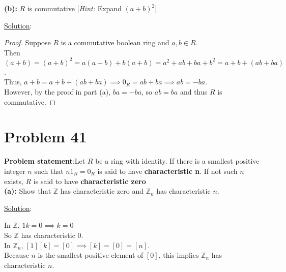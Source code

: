 \documentclass{article} %
\begin{document}
\textbf{(b):} $R$ is commutative [\textit{Hint:} Expand $(a + b)^2$]
\\
\begin{addmargin}[1em]{0em}
\underline{Solution}:
\begin{proof}
Suppose $R$ is a commutative boolean ring and $a, b \in R$.
\\Then $(a + b) = (a + b)^2 = a(a + b) + b(a + b) = a^2 + ab + ba + b^2 = a + b + (ab + ba)$.
\\Thus, $a + b = a + b + (ab + ba) \implies 0_R = ab + ba \implies ab = -ba$.
\\However, by the proof in part (a), $ba = -ba$, so $ab = ba$ and thus $R$ is commutative.
\end{proof}
\end{addmargin}

\newpage

\section*{Problem 41}

\textbf{Problem statement}:Let $R$ be a ring with identity.  If there is a smallest positive integer $n$ such that $n1_R = 0_R$ is said to have \textbf{characteristic n}.  If not such $n$ exists, $R$ is said to have \textbf{characteristic zero}
\\

\textbf{(a):} Show that $\mathbb{Z}$ has characteristic zero and $\mathbb{Z}_n$ has characteristic $n$.
\\
\begin{addmargin}[1em]{0em}
\underline{Solution}:
\begin{addmargin}[1em]{0em}
In $\mathbb{Z}$, $1k = 0 \implies k = 0$
\\So $\mathbb{Z}$ has characteristic 0.
\\In $\mathbb{Z}_n$, $[1][k] = [0] \implies [k] = [0] = [n]$.
\\Because $n$ is the smallest positive element of $[0]$, this implies $\mathbb{Z}_n$ has characteristic $n$.\\
\end{addmargin}
\end{addmargin}    
\end{document}
